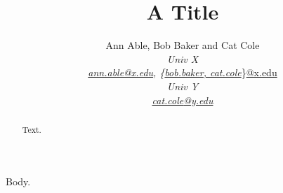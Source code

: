\documentclass{llncs}
\begin{document}
\title{A Title}
\author{Ann Able, Bob Baker and Cat Cole \\
\textit{Univ X} \\
\textit{\url{ann.able@x.edu}, \{\url{bob.baker, cat.cole}}\}\url{@x.edu} \\
\textit{Univ Y} \\
\textit{\url{cat.cole}\url{@y.edu}}}
\institute{}
\maketitle
\begin{abstract}Text.\end{abstract}
Body.
\end{document}
